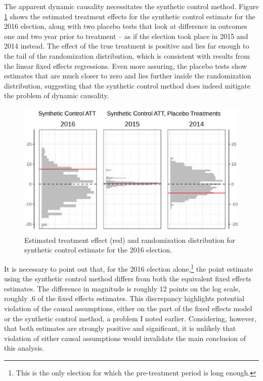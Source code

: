 \documentclass[12pt]{article}\usepackage[]{graphicx}\usepackage[]{color}
\newcommand{\1}{\mathbbm{1}}
\begin{document}
The apparent dynamic causality necessitates the synthetic control method. Figure \ref{fig:Synth} shows the estimated treatment effects for the synthetic control estimate for the 2016 election, along with two placebo tests that look at difference in outcomes one and two year prior to treatment -- as if the election took place in 2015 and 2014 instead. The effect of the true treatment is positive and lies far enough to the tail of the randomization distribution, which is consistent with results from the linear fixed effects regressions. Even more assuring, the placebo tests show estimates that are much closer to zero and lies further inside the randomization distribution, suggesting that the synthetic control method does indeed mitigate the problem of dynamic causality.

\begin{figure}[!htbp]
	\centering
	\includegraphics[width=\textwidth]{figure/SYP_Synth.png}
	\captionsetup{singlelinecheck=off}
	\caption[Estimated treatment effects for Synthetic Control]{Estimated treatment effect (red) and randomization distribution for synthetic control estimate for the 2016 election.}
	\label{fig:Synth}
\end{figure}

It is necessary to point out that, for the 2016 election alone,\footnote{This is the only election for which the pre-treatment period is long enough.} the point estimate using the synthetic control method differs from both the equivalent fixed effects estimates. The difference in magnitude is roughly 12 points on the log scale, roughly .6 of the fixed effects estimates. This discrepancy highlights potential violation of the causal assumptions, either on the part of the fixed effects model or the synthetic control method, a problem I noted earlier. Considering, however, that both estimates are strongly positive and significant, it is unlikely that violation of either causal assumptions would invalidate the main conclusion of this analysis.
\end{document}
